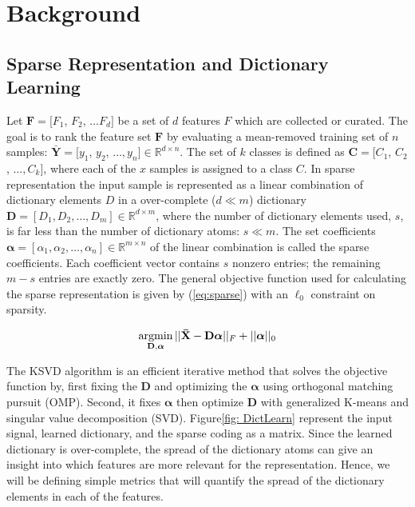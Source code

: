 \chapter{Background}\label{ch:Background}

\section{Sparse Representation and Dictionary Learning}

Let $\mathbf{F} = [F_1$, $F_2$, $\dots F_d]$ be a set of $d$ features $F$ which are collected or curated. The goal is to rank the feature set $\mathbf{F}$ by evaluating a mean-removed training set of $n$ samples: $\mathbf{\bar{Y}} = [y_1$, $y_2$, $\dots, y_n] \in \mathbb{R}^{d \times n}$. The set of $k$ classes is defined as $\mathbf{C} = [C_1$, $C_2$, $\dots, C_k]$, where each of the $x$ samples is assigned to a class $C$. In sparse representation the input sample is represented as a linear combination of dictionary elements $D$ in a over-complete ($d \ll m$) dictionary $\mathbf{D} = [D_1, D_2, \dots, D_m] \in \mathbb{R}^{d \times m}$, where the number of dictionary elements used, $s$, is far less than the number of dictionary atoms: $s \ll m$. The set coefficients $\bm{\alpha} = [\alpha_1, \alpha_2, \dots, \alpha_n] \in \mathbb{R}^{m \times n}$ of the linear combination is called the sparse coefficients. Each coefficient vector contains $s$ nonzero entries; the remaining $m-s$ entries are exactly zero. The general objective function used for calculating the sparse representation is given by (\ref{eq:sparse}) with an $\ell_0$ constraint on sparsity.

\begin{equation}
    \label{eq:sparse}
    \operatorname*{argmin}_{\mathbf{D},\bm{\alpha}} ||\mathbf{\bar{X}}- \mathbf{D}\bm{\alpha}||_F + ||\bm{\alpha}||_0
\end{equation}

The KSVD algorithm is an efficient iterative method that solves the objective function by, first fixing the $\mathbf{D}$ and optimizing the $\bm{\alpha}$ using orthogonal matching pursuit (OMP)\cite{Pati1993}. Second, it fixes $\bm{\alpha}$ then optimize $\mathbf{D}$ with generalized K-means and singular value decomposition (SVD). Figure\ref{fig: DictLearn} represent the input signal, learned dictionary, and the sparse coding as a matrix. Since the learned dictionary is over-complete, the spread of the dictionary atoms can give an insight into which features are more relevant for the representation. Hence, we will be defining simple metrics that will quantify the spread of the dictionary elements in each of the features. 

